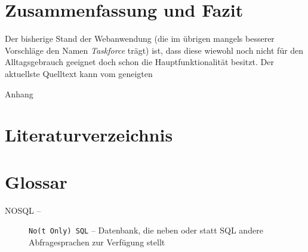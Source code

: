 \documentclass[12pt,ngerman,a4]{scrartcl}
\newcommand{\blitem}[3]{\item[#1 --] \texttt{#2} -- #3}
\begin{document}
\section{Zusammenfassung und Fazit}
Der bisherige Stand der Webanwendung (die im übrigen mangels besserer Vorschläge den Namen \emph{Taskforce} trägt) ist, dass diese wiewohl noch nicht für den Alltagsgebrauch geeignet doch schon die Hauptfunktionalität besitzt. Der aktuellste Quelltext kann vom geneigten 

\clearpage
\textsf{\huge Anhang}
\appendix

\section{Literaturverzeichnis}
\vspace{-1.5cm}
\nocite{*}

\renewcommand{\refname}{}

\bigskip

\section{Glossar}
\begin{description}
\blitem{NOSQL}{No(t Only) SQL}{Datenbank, die neben oder statt SQL andere Abfragesprachen zur Verfügung stellt}
\end{description}
\end{document}
